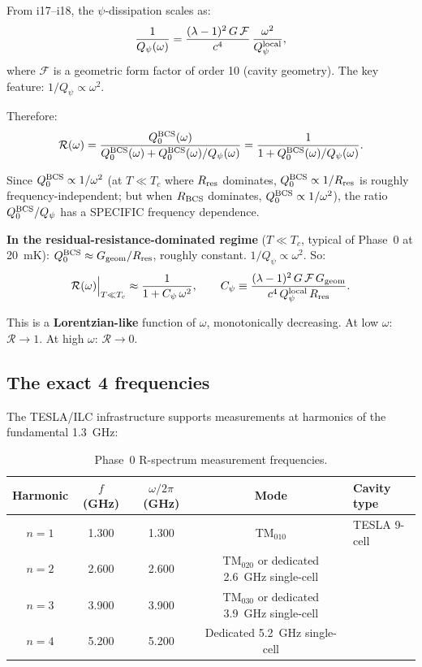 \documentclass[11pt]{article}
\newcommand{\Qpsi}{Q_\psi}
\theoremstyle{definition}
\theoremstyle{remark}
\begin{document}
From i17--i18, the $\psi$-dissipation scales as:
\begin{equation}
\frac{1}{Q_\psi(\omega)} = \frac{(\lambda-1)^2\,G\,\mathcal{F}}{c^4}
\,\frac{\omega^2}{\Qpsi^{\rm local}},
\label{eq:psi-loss}
\end{equation}
where $\mathcal{F}$ is a geometric form factor of order 10 (cavity
geometry). The key feature: $1/Q_\psi \propto \omega^2$.

Therefore:
\begin{equation}
\mathcal{R}(\omega) = \frac{Q_0^{\rm BCS}(\omega)}{Q_0^{\rm BCS}(\omega)
+ Q_0^{\rm BCS}(\omega)/Q_\psi(\omega)}
= \frac{1}{1 + Q_0^{\rm BCS}(\omega)/Q_\psi(\omega)}.
\end{equation}

Since $Q_0^{\rm BCS} \propto 1/\omega^2$ (at $T \ll T_c$ where
$R_{\rm res}$ dominates, $Q_0^{\rm BCS} \propto 1/R_{\rm res}$ is
roughly frequency-independent; but when $R_{\rm BCS}$ dominates,
$Q_0^{\rm BCS} \propto 1/\omega^2$), the ratio
$Q_0^{\rm BCS}/Q_\psi$ has a SPECIFIC frequency dependence.

\textbf{In the residual-resistance-dominated regime} ($T \ll T_c$,
typical of Phase~0 at 20~mK):
$Q_0^{\rm BCS} \approx G_{\rm geom}/R_{\rm res}$, roughly constant.
$1/Q_\psi \propto \omega^2$. So:
\begin{equation}
\mathcal{R}(\omega)\Big|_{T \ll T_c}
\approx \frac{1}{1 + C_\psi\,\omega^2},
\qquad C_\psi \equiv \frac{(\lambda-1)^2\,G\,\mathcal{F}\,G_{\rm geom}}
{c^4\,\Qpsi^{\rm local}\,R_{\rm res}}.
\label{eq:R-spectrum}
\end{equation}

This is a \textbf{Lorentzian-like} function of $\omega$, monotonically
decreasing. At low $\omega$: $\mathcal{R} \to 1$. At high $\omega$:
$\mathcal{R} \to 0$.

\subsection{The exact 4 frequencies}

The TESLA/ILC infrastructure supports measurements at harmonics of the
fundamental 1.3~GHz:

\begin{table}[H]
\centering
\caption{Phase~0 R-spectrum measurement frequencies.}
\label{tab:frequencies}
\renewcommand{\arraystretch}{1.3}
\begin{tabular}{@{}ccccl@{}}
\toprule
\textbf{Harmonic} & \textbf{$f$ (GHz)} & \textbf{$\omega/2\pi$ (GHz)}
& \textbf{Mode} & \textbf{Cavity type} \\
\midrule
$n = 1$ & 1.300 & 1.300 & TM$_{010}$ & TESLA 9-cell \\
$n = 2$ & 2.600 & 2.600 & TM$_{020}$ or dedicated 2.6~GHz single-cell \\
$n = 3$ & 3.900 & 3.900 & TM$_{030}$ or dedicated 3.9~GHz single-cell \\
$n = 4$ & 5.200 & 5.200 & Dedicated 5.2~GHz single-cell \\
\bottomrule
\end{tabular}
\end{table}
\end{document}
